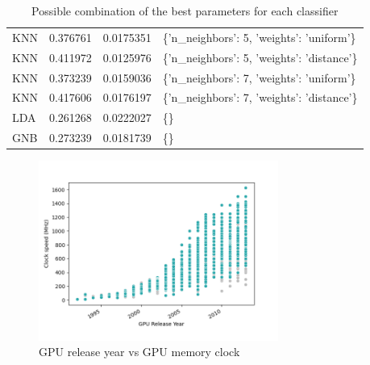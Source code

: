 \documentclass[conference,onecolumn]{IEEEtran}
\begin{document}
\begin{table}[H]
\begin{center}
\begin{longtable}{lrrl}
             KNN          &   0.376761 &       0.0175351  & \{'n\_neighbors': 5, 'weights': 'uniform'\}                          \\
             KNN          &   0.411972 &       0.0125976  & \{'n\_neighbors': 5, 'weights': 'distance'\}                         \\
             KNN          &   0.373239 &       0.0159036  & \{'n\_neighbors': 7, 'weights': 'uniform'\}                          \\
             KNN          &   0.417606 &       0.0176197  & \{'n\_neighbors': 7, 'weights': 'distance'\}                         \\
             LDA          &   0.261268 &       0.0222027  & \{\}                                                                \\
             GNB          &   0.273239 &       0.0181739  & \{\}                                                                \\
            \hline
        \end{longtable}
        \caption{Possible combination of the best parameters for each classifier}
        \label{appdx:bestParameters}
        \end{center}
    \end{table}
        
\begin{figure}[H]
    \centering
    \includegraphics[width=0.7\textwidth]{Plots/DatagpuClockvsmemClock.png}
    \caption{GPU release year vs GPU memory clock}
    \label{appdx:gpuReleaseYearvsGPUMemoryClock}
\end{figure}
\end{document}

